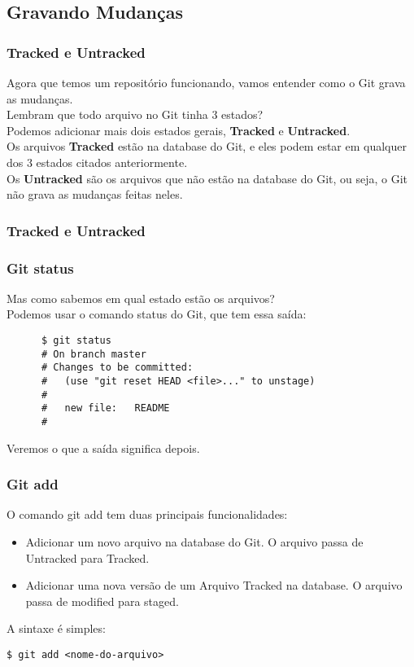 \documentclass[brazil]{beamer}
\begin{document}
\subsection{Gravando Mudanças}

\begin{frame}[fragile]
  \frametitle{Tracked e Untracked}
  Agora que temos um repositório funcionando, vamos entender como o Git grava as mudanças. \\
  \pause
  Lembram que todo arquivo no Git tinha 3 estados? \\
  \pause
  Podemos adicionar mais dois estados gerais, \textbf{Tracked} e \textbf{Untracked}. \\
  \pause
  Os arquivos \textbf{Tracked} estão na database do Git, e eles podem estar em qualquer dos 3 estados citados
  anteriormente. \\
  \pause
  Os \textbf{Untracked} são os arquivos que não estão na database do Git, ou seja, o Git não grava as mudanças
  feitas neles.
\end{frame}

\begin{frame}[fragile]
  \frametitle{Tracked e Untracked}
\end{frame}

\begin{frame}[fragile]
  \frametitle{Git status}
  Mas como sabemos em qual estado estão os arquivos? \\
  \pause
  Podemos usar o comando status do Git, que tem essa saída:
  \begin{block}{}
    \begin{verbatim}
      $ git status
      # On branch master
      # Changes to be committed:
      #   (use "git reset HEAD <file>..." to unstage)
      #
      #   new file:   README
      #
    \end{verbatim}
  \end{block}
  Veremos o que a saída significa depois.
\end{frame}

\begin{frame}[fragile]
  \frametitle{Git add}
  O comando git add tem duas principais funcionalidades:
  \begin{itemize}
    \item Adicionar um novo arquivo na database do Git. O arquivo passa de Untracked para Tracked.
    \item Adicionar uma nova versão de um Arquivo Tracked na database. O arquivo passa de modified para staged.
  \end{itemize}
  A sintaxe é simples:
  \begin{block}{}
    \verb#$ git add <nome-do-arquivo>#
  \end{block}
\end{frame}
\end{document}
